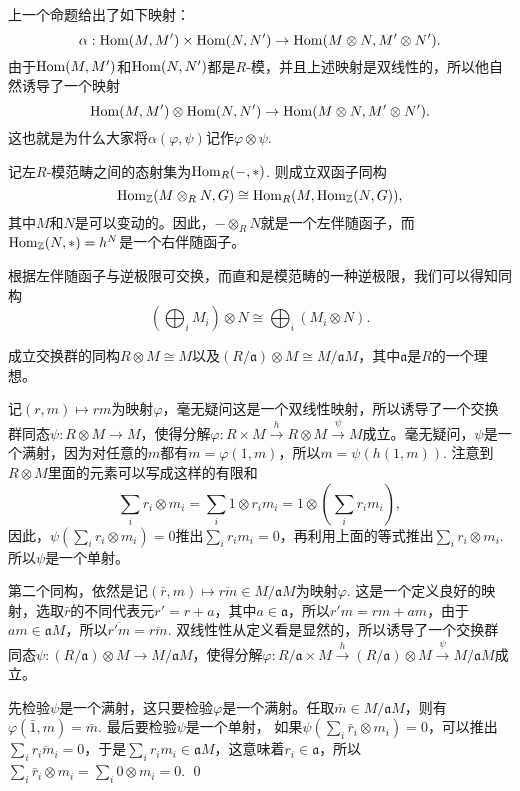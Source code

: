 \para 上一个命题给出了如下映射：
\[
	\alpha:\operatorname{Hom}(M,M')\times \operatorname{Hom}(N,N')\to \operatorname{Hom}(M\otimes N,M'\otimes N').
\]
由于$\operatorname{Hom}(M,M')$和$\operatorname{Hom}(N,N')$都是$R$-模，并且上述映射是双线性的，所以他自然诱导了一个映射
\[
	\operatorname{Hom}(M,M')\otimes \operatorname{Hom}(N,N')\to \operatorname{Hom}(M\otimes N,M'\otimes N').
\]
这也就是为什么大家将$\alpha(\varphi,\psi)$记作$\varphi\otimes \psi$. 

\pro 记左$R$-模范畴之间的态射集为$\operatorname{Hom}_R(-,*)$. 则成立双函子同构
\[
	\operatorname{Hom}_{\mathbb{Z}}(M\otimes_R N,G)\cong \operatorname{Hom}_R(M,\operatorname{Hom}_\mathbb{Z}(N,G)),
\]
其中$M$和$N$是可以变动的。因此，$-\otimes_R N$就是一个左伴随函子，而$\operatorname{Hom}_\mathbb{Z}(N,*)=h^N$是一个右伴随函子。\notprove

根据左伴随函子与逆极限可交换，而直和是模范畴的一种逆极限，我们可以得知同构
\[
	\left(\bigoplus_i M_i\right)\otimes N\cong \bigoplus_i \left(M_i\otimes N\right).
\]

\pro 成立交换群的同构$R\otimes M\cong M$以及$(R/\mathfrak{a})\otimes M\cong M/\mathfrak{a}M$，其中$\mathfrak{a}$是$R$的一个理想。

\proof
	记$(r,m)\mapsto rm$为映射$\varphi$，毫无疑问这是一个双线性映射，所以诱导了一个交换群同态$\psi:R\otimes M\to M$，使得分解$\varphi:R\times M\xrightarrow{h} R\otimes M\xrightarrow{\psi} M$成立。毫无疑问，$\psi$是一个满射，因为对任意的$m$都有$m=\varphi(1,m)$，所以$m=\psi(h(1,m))$. 注意到$R\otimes M$里面的元素可以写成这样的有限和
	\[
	\sum_i r_i\otimes m_i=\sum_i 1\otimes r_im_i=1\otimes \left(\sum_i r_i m_i\right),
	\]
	因此，$\psi\left(\sum_i r_i\otimes m_i\right)=0$推出$\sum_i r_i m_i=0$，再利用上面的等式推出$\sum_i r_i\otimes m_i$. 所以$\psi$是一个单射。

	第二个同构，依然是记$(\bar{r},m)\mapsto \overline{rm}\in M/\mathfrak{a}M$为映射$\varphi$. 这是一个定义良好的映射，选取$\bar{r}$的不同代表元$r'=r+a$，其中$a\in\mathfrak{a}$，所以$r'm=rm+am$，由于$am\in \mathfrak{a}M$，所以$\overline{r'm}=\overline{rm}$. 双线性性从定义看是显然的，所以诱导了一个交换群同态$\psi:(R/\mathfrak{a})\otimes M\to M/\mathfrak{a}M$，使得分解$\varphi:R/\mathfrak{a}\times M\xrightarrow{h} (R/\mathfrak{a})\otimes M\xrightarrow{\psi} M/\mathfrak{a}M$成立。

	先检验$\psi$是一个满射，这只要检验$\varphi$是一个满射。任取$\bar{m}\in M/\mathfrak{a}M$，则有$\varphi(\bar{1},m)=\bar{m}$. 最后要检验$\psi$是一个单射，
	如果$\psi(\sum_i \bar{r}_i\otimes m_i)=0$，可以推出$\sum_i \overline{r_im_i}=0$，于是$\sum_i r_im_i \in \mathfrak{a}M$，这意味着$r_i\in \mathfrak{a}$，所以$\sum_i \bar{r}_i\otimes m_i=\sum_i 0\otimes m_i=0$.
\qed

